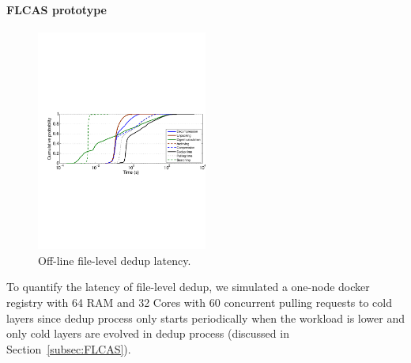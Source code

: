 \paragraph{FLCAS prototype}

\begin{figure}
	\centering
	\includegraphics[width=0.5\textwidth]{graphs/res-time.pdf}
	\caption{Off-line file-level dedup latency.
	}
	\label{fig:dedup-res}
\end{figure}

To quantify the latency of file-level dedup, we simulated a one-node docker registry with 64 RAM and 32 Cores with 60 concurrent pulling requests to cold layers since dedup process only starts periodically when the workload is lower and only cold layers are evolved in dedup process (discussed in Section~\ref{subsec:FLCAS}).
%
%


